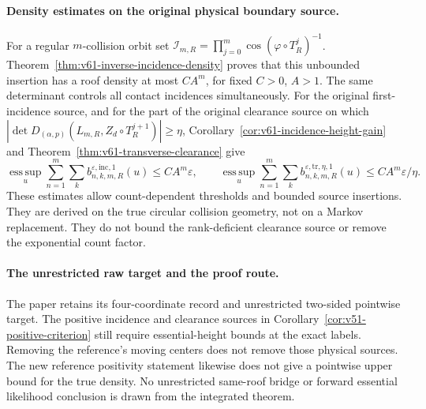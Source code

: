 \documentclass[11pt,reqno]{amsart}
\numberwithin{equation}{section}
\theoremstyle{definition}\newtheorem{definition}[theorem]{Definition}
\theoremstyle{remark}\newtheorem{remark}[theorem]{Remark}
\begin{document}
\paragraph{Density estimates on the original physical boundary source.}
For a regular $m$-collision orbit set
$\mathcal I_{m,R}=\prod_{j=0}^m\cos(\varphi\circ T_R^j)^{-1}$.
Theorem~\ref{thm:v61-inverse-incidence-density} proves that this unbounded
insertion has a roof density at most $CA^m$, for fixed $C>0$, $A>1$.
The same determinant controls all contact incidences simultaneously.
For the original first-incidence source, and for the part of the original
clearance source on which
$|\det D_{(\alpha,p)}(L_{m,R},Z_d\circ T_R^{j+1})|\ge\eta$,
Corollary~\ref{cor:v61-incidence-height-gain} and
Theorem~\ref{thm:v61-transverse-clearance} give
\[
 \operatorname*{ess\,sup}_u\sum_{n=1}^m\sum_k
 b^{\varepsilon,\mathrm{inc},1}_{n,k,m,R}(u)\le CA^m\varepsilon,
 \qquad
 \operatorname*{ess\,sup}_u\sum_{n=1}^m\sum_k
 b^{\varepsilon,\mathrm{tr},\eta,1}_{n,k,m,R}(u)
       \le CA^m\varepsilon/\eta.
\]
These estimates allow count-dependent thresholds and bounded source
insertions. They are derived on the true circular collision geometry,
not on a Markov replacement. They do not bound the rank-deficient
clearance source or remove the exponential count factor.

\paragraph{The unrestricted raw target and the proof route.}
The paper retains its four-coordinate record and unrestricted
two-sided pointwise target. The positive incidence and clearance
sources in Corollary~\ref{cor:v51-positive-criterion} still require
essential-height bounds at the exact labels. Removing the reference's
moving centers does not remove those physical sources. The new
reference positivity statement likewise does not give a pointwise
upper bound for the true density. No unrestricted same-roof bridge
or forward essential likelihood conclusion is drawn from the
integrated theorem.
\end{document}
